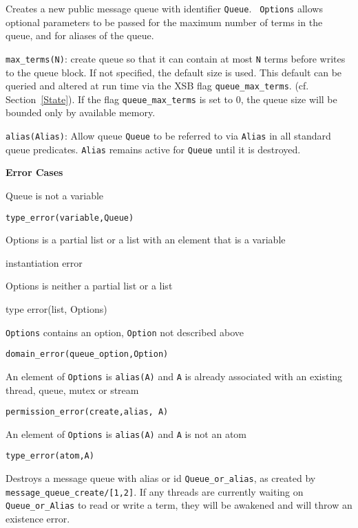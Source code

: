 \begin{description}
%
Creates a new public message queue with identifier {\tt Queue}.  {\tt
  Options} allows optional parameters to be passed for the maximum
number of terms in the queue, and for aliases of the queue.
%
\bi
\item {\tt max\_terms(N)}: create queue so that it can contain at most
  {\tt N} terms before writes to the queue block.  If not specified,
  the default size is used.  This default can be queried and altered
  at run time via the XSB flag {\tt queue\_max\_terms}.
  (cf. Section~\ref{State}).  If the flag {\tt queue\_max\_terms} is
  set to 0, the queue size will be bounded only by available memory.
%
\item {\tt alias(Alias)}: Allow queue {\tt Queue} to be referred to
  via {\tt Alias} in all standard queue predicates.  {\tt Alias}
  remains active for {\tt Queue} until it is destroyed.
\ei

{\bf Error Cases}
\bi
\item 	Queue is not a variable
\bi
\item 	{\tt type\_error(variable,Queue)}
\ei
\item Options is a partial list or a list with an element that is a
  variable 
\bi
\item  instantiation error
\ei
\item Options is neither a partial list or a list
\bi
\item  type error(list, Options)
\ei
\item 	{\tt Options} contains an option, {\tt Option} not described above
\bi
\item 	{\tt domain\_error(queue\_option,Option)}
\ei
%
\item An element of {\tt Options} is {\tt alias(A)} and {\tt A} is
  already associated with an existing thread, queue, mutex or stream 
\bi
\item {\tt permission\_error(create,alias, A)}
\ei
\item An element of {\tt Options} is {\tt alias(A)} and {\tt A} is not an atom
\bi
\item {\tt type\_error(atom,A)}
\ei
\ei

%
Destroys a message queue with alias or id {\tt Queue\_or\_alias}, as
created by {\tt message\_queue\_create/[1,2]}.
If any threads are currently waiting on {\tt Queue\_or\_Alias} to read
or write a term, they will be awakened and will throw an existence
error.


\end{description}
